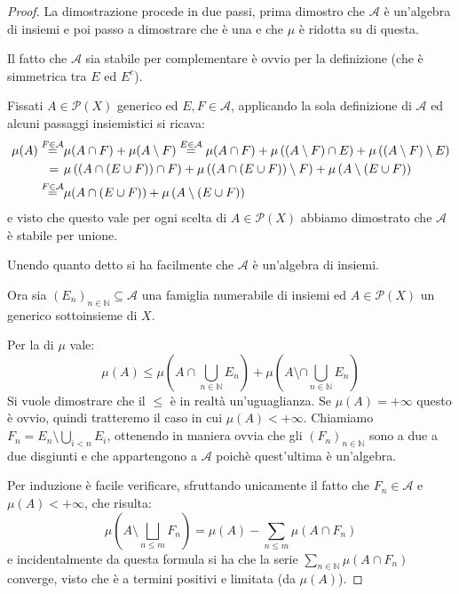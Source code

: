 \begin{proof}
	La dimostrazione procede in due passi, prima dimostro che $\mathcal A$ è un'algebra di insiemi e poi passo a dimostrare che è una \sigalg{} e che $\mu$ è \sigadd{} ridotta su di questa.
	
	Il fatto che $\mathcal A$ sia stabile per complementare è ovvio per la definizione (che è simmetrica tra $E$ ed $E^c$).
	
	Fissati $A\in\mathcal P(X)$ generico ed $E,F\in\mathcal A$, applicando la sola definizione di $\mathcal A$ ed alcuni passaggi insiemistici si ricava:
	\begin{align*}
		\mu(A)\stackrel{F\in\mathcal A}{=}&\mu(A\cap F)+\mu(A\setminus F)\stackrel{E\in\mathcal A}{=}
		\mu(A\cap F)+\mu\left((A\setminus F)\cap E\right)+\mu\left((A\setminus F)\setminus E\right)\\
		=\hspace{0.4em}&\mu\left((A\cap (E\cup F))\cap F\right)+\mu\left((A\cap (E\cup F))\setminus F\right)+
		\mu\left(A\setminus(E\cup F)\right)\\
		\stackrel{F\in\mathcal A}{=}&\mu(A\cap (E\cup F))+\mu\left(A\setminus(E\cup F)\right)
	\end{align*}
	e visto che questo vale per ogni scelta di $A\in\mathcal P(X)$ abbiamo dimostrato che $\mathcal A$ è stabile per unione.
	
	Unendo quanto detto si ha facilmente che $\mathcal A$ è un'algebra di insiemi.
	
	Ora sia $(E_n)_{n\in\mathbb N}\subseteq \mathcal A$ una famiglia numerabile di insiemi ed $A\in\mathcal P(X)$ un generico sottoinsieme di $X$.
	
	Per la \sigsubadd[ità] di $\mu$ vale:
	\begin{equation}\label{DisuguaglianzaFacileCaratheodory}
		\mu(A)\le \mu\left(A\cap\bigcup_{n\in\mathbb N} E_n\right)+\mu\left(A\setminus\cap\bigcup_{n\in\mathbb N} E_n\right)
	\end{equation}
	Si vuole dimostrare che il $\le$ è in realtà un'uguaglianza. Se $\mu(A)=+\infty$ questo è ovvio, quindi tratteremo il caso in cui $\mu(A)<+\infty$. Chiamiamo $F_n=E_n\setminus \bigcup_{i<n} E_i$, ottenendo in maniera ovvia che gli $(F_n)_{n\in\mathbb N}$ sono a due a due disgiunti e che appartengono a $\mathcal A$ poichè quest'ultima è un'algebra.
	
	Per induzione è facile verificare, sfruttando unicamente il fatto che $F_n\in\mathcal A$ e $\mu(A)<+\infty$, che risulta:
	\begin{equation}\label{IdentitaDifferenzaCaratheodory}
		\mu\left(A\setminus \bigsqcup_{n\le m} F_n\right)=\mu(A)-\sum_{n\le m} \mu(A\cap F_n)
	\end{equation}
	e incidentalmente da questa formula si ha che la serie $\sum_{n\in\mathbb N}\mu(A\cap F_n)$ converge, visto che è a termini positivi e limitata (da $\mu(A)$).
	

\end{proof}
